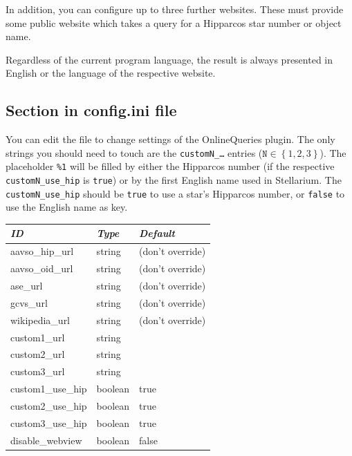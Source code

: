 In addition, you can configure up to three further websites. These
must provide some public website which takes a query for a Hipparcos
star number or object name.  

Regardless of the current program language, the result is always
presented in English or the language of the respective website.


\subsection{Section  in config.ini file}

You can edit the  file to change settings of the
OnlineQueries plugin.  The only strings you should need to touch are
the \texttt{customN\_\ldots} entries ($\mathtt{N}\in \left\{ 1, 2,
3\right\}$). The placeholder \texttt{\%1} will be filled by either the
Hipparcos number (if the respective \texttt{customN\_use\_hip} is
\texttt{true}) or by the first English name used in Stellarium. The
\texttt{customN\_use\_hip} should be \texttt{true} to use a star's
Hipparcos number, or \texttt{false} to use the English name as key.


\begin{center}
{\small
\begin{tabular}{l|l|l}\toprule
\emph{ID} & \emph{Type} & \emph{Default}\\\midrule
aavso\_hip\_url      &string & (don't override)\\ %
aavso\_oid\_url      &string & (don't override)\\ %
ase\_url             &string & (don't override)\\ %
gcvs\_url            &string & (don't override)\\ %
wikipedia\_url       &string & (don't override)\\ %
\midrule
custom1\_url         &string & \\
custom2\_url         &string & \\
custom3\_url         &string & \\
custom1\_use\_hip    &boolean& true \\
custom2\_use\_hip    &boolean& true \\
custom3\_use\_hip    &boolean& true \\\midrule
disable\_webview     &boolean&false \\
\bottomrule
\end{tabular}
}
\end{center}

